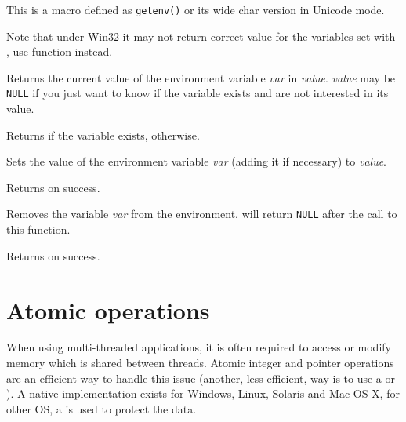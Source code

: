 This is a macro defined as {\tt getenv()} or its wide char version in Unicode
mode.

Note that under Win32 it may not return correct value for the variables set
with , use  function
instead.


\label{wxgetenv}


Returns the current value of the environment variable {\it var} in {\it value}.
{\it value} may be {\tt NULL} if you just want to know if the variable exists
and are not interested in its value.

Returns \true if the variable exists, \false otherwise.


\label{wxsetenv}


Sets the value of the environment variable {\it var} (adding it if necessary)
to {\it value}.

Returns \true on success.




\label{wxunsetenv}


Removes the variable {\it var} from the environment.
 will return {\tt NULL} after the call to this
function.

Returns \true on success.




\section{Atomic operations}\label{atomicoperations}

When using multi-threaded applications, it is often required to access or
modify memory which is shared between threads. Atomic integer and pointer
operations are an efficient way to handle this issue (another, less efficient,
way is to use a  or ). A native implementation exists for Windows,
Linux, Solaris and Mac OS X, for other OS, a 
 is used to protect the data.

